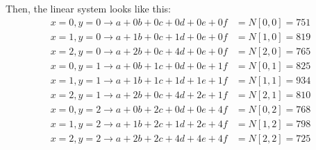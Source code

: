 Then, the linear system looks like this:
\begin{align*}
x=0,y=0 \rightarrow a + 0b + 0c + 0d + 0e + 0f &= N[0,0] = 751 \\
x=1,y=0 \rightarrow a + 1b + 0c + 1d + 0e + 0f &= N[1,0] = 819 \\
x=2,y=0 \rightarrow a + 2b + 0c + 4d + 0e + 0f &= N[2,0] = 765 \\
x=0,y=1 \rightarrow a + 0b + 1c + 0d + 0e + 1f &= N[0,1] = 825 \\
x=1,y=1 \rightarrow a + 1b + 1c + 1d + 1e + 1f &= N[1,1] = 934 \\
x=2,y=1 \rightarrow a + 2b + 0c + 4d + 2e + 1f &= N[2,1] = 810 \\
x=0,y=2 \rightarrow a + 0b + 2c + 0d + 0e + 4f &= N[0,2] = 768 \\
x=1,y=2 \rightarrow a + 1b + 2c + 1d + 2e + 4f &= N[1,2] = 798 \\
x=2,y=2 \rightarrow a + 2b + 2c + 4d + 4e + 4f &= N[2,2] = 725 \\
\end{align*}

